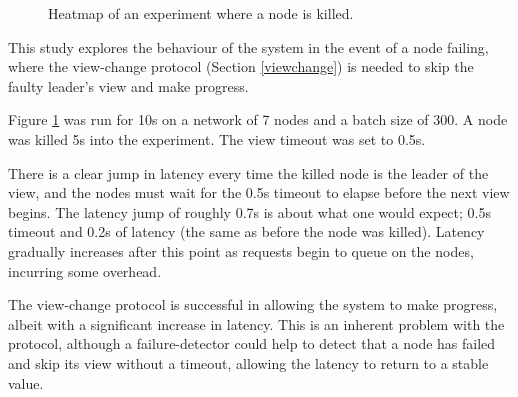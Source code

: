 \begin{figure}[h!]
\centering
\resizebox{\textwidth}{!}{}
\caption{Heatmap of an experiment where a node is killed.}
\label{viewchangeheatmap}
\end{figure}

This study explores the behaviour of the system in the event of a node failing, where the view-change protocol (Section \ref{viewchange}) is needed to skip the faulty leader's view and make progress.

Figure \ref{viewchangeheatmap} was run for 10s on a network of 7 nodes and a batch size of 300. A node was killed 5s into the experiment. The view timeout was set to 0.5s.

There is a clear jump in latency every time the killed node is the leader of the view, and the nodes must wait for the 0.5s timeout to elapse before the next view begins. The latency jump of roughly 0.7s is about what one would expect; 0.5s timeout and 0.2s of latency (the same as before the node was killed). Latency gradually increases after this point as requests begin to queue on the nodes, incurring some overhead.

The view-change protocol is successful in allowing the system to make progress, albeit with a significant increase in latency. This is an inherent problem with the protocol, although a failure-detector could help to detect that a node has failed and skip its view without a timeout, allowing the latency to return to a stable value.









